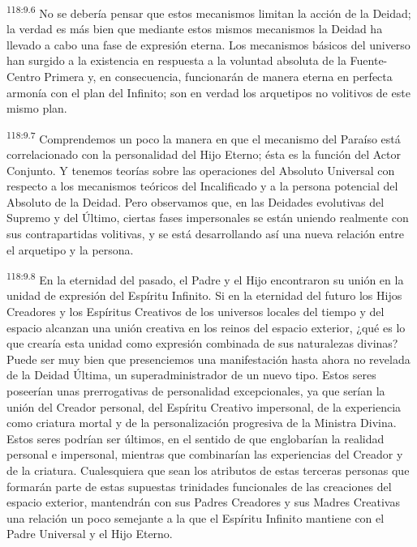 \documentclass[twoside, 11pt]{book}
\begin{document}
\par
\textsuperscript{118:9.6} No se debería pensar que estos mecanismos limitan la acción de la Deidad; la verdad es más bien que mediante estos mismos mecanismos la Deidad ha llevado a cabo una fase de expresión eterna. Los mecanismos básicos del universo han surgido a la existencia en respuesta a la voluntad absoluta de la Fuente-Centro Primera y, en consecuencia, funcionarán de manera eterna en perfecta armonía con el plan del Infinito; son en verdad los arquetipos no volitivos de este mismo plan.

\par
\textsuperscript{118:9.7} Comprendemos un poco la manera en que el mecanismo del Paraíso está correlacionado con la personalidad del Hijo Eterno; ésta es la función del Actor Conjunto. Y tenemos teorías sobre las operaciones del Absoluto Universal con respecto a los mecanismos teóricos del Incalificado y a la persona potencial del Absoluto de la Deidad. Pero observamos que, en las Deidades evolutivas del Supremo y del Último, ciertas fases impersonales se están uniendo realmente con sus contrapartidas volitivas, y se está desarrollando así una nueva relación entre el arquetipo y la persona.

\par
\textsuperscript{118:9.8} En la eternidad del pasado, el Padre y el Hijo encontraron su unión en la unidad de expresión del Espíritu Infinito. Si en la eternidad del futuro los Hijos Creadores y los Espíritus Creativos de los universos locales del tiempo y del espacio alcanzan una unión creativa en los reinos del espacio exterior, ¿qué es lo que crearía esta unidad como expresión combinada de sus naturalezas divinas? Puede ser muy bien que presenciemos una manifestación hasta ahora no revelada de la Deidad Última, un superadministrador de un nuevo tipo. Estos seres poseerían unas prerrogativas de personalidad excepcionales, ya que serían la unión del Creador personal, del Espíritu Creativo impersonal, de la experiencia como criatura mortal y de la personalización progresiva de la Ministra Divina. Estos seres podrían ser últimos, en el sentido de que englobarían la realidad personal e impersonal, mientras que combinarían las experiencias del Creador y de la criatura. Cualesquiera que sean los atributos de estas terceras personas que formarán parte de estas supuestas trinidades funcionales de las creaciones del espacio exterior, mantendrán con sus Padres Creadores y sus Madres Creativas una relación un poco semejante a la que el Espíritu Infinito mantiene con el Padre Universal y el Hijo Eterno.
\end{document}
